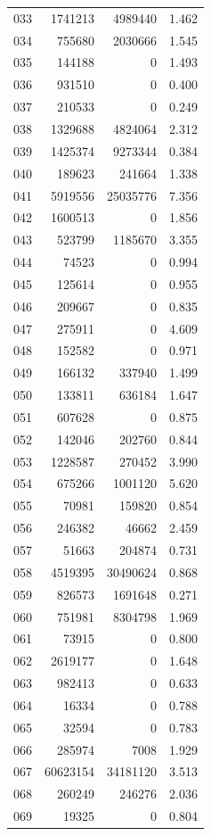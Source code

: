 \documentclass[anonymous,notoc]{gmcm2026}
\begin{document}
\begin{longtable}{lrrr}
033 & 1741213 & 4989440 & 1.462 \\
034 & 755680 & 2030666 & 1.545 \\
035 & 144188 & 0 & 1.493 \\
036 & 931510 & 0 & 0.400 \\
037 & 210533 & 0 & 0.249 \\
038 & 1329688 & 4824064 & 2.312 \\
039 & 1425374 & 9273344 & 0.384 \\
040 & 189623 & 241664 & 1.338 \\
041 & 5919556 & 25035776 & 7.356 \\
042 & 1600513 & 0 & 1.856 \\
043 & 523799 & 1185670 & 3.355 \\
044 & 74523 & 0 & 0.994 \\
045 & 125614 & 0 & 0.955 \\
046 & 209667 & 0 & 0.835 \\
047 & 275911 & 0 & 4.609 \\
048 & 152582 & 0 & 0.971 \\
049 & 166132 & 337940 & 1.499 \\
050 & 133811 & 636184 & 1.647 \\
051 & 607628 & 0 & 0.875 \\
052 & 142046 & 202760 & 0.844 \\
053 & 1228587 & 270452 & 3.990 \\
054 & 675266 & 1001120 & 5.620 \\
055 & 70981 & 159820 & 0.854 \\
056 & 246382 & 46662 & 2.459 \\
057 & 51663 & 204874 & 0.731 \\
058 & 4519395 & 30490624 & 0.868 \\
059 & 826573 & 1691648 & 0.271 \\
060 & 751981 & 8304798 & 1.969 \\
061 & 73915 & 0 & 0.800 \\
062 & 2619177 & 0 & 1.648 \\
063 & 982413 & 0 & 0.633 \\
064 & 16334 & 0 & 0.788 \\
065 & 32594 & 0 & 0.783 \\
066 & 285974 & 7008 & 1.929 \\
067 & 60623154 & 34181120 & 3.513 \\
068 & 260249 & 246276 & 2.036 \\
069 & 19325 & 0 & 0.804 \\

\end{longtable}
\end{document}
